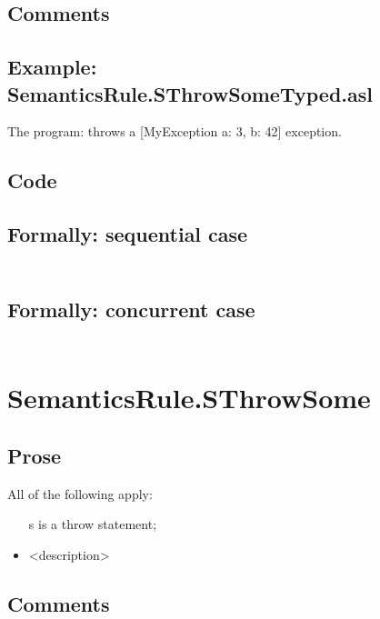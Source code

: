 \documentclass{book}
\begin{document}
    \subsection{Comments}

    \subsection{Example: SemanticsRule.SThrowSomeTyped.asl}
    The program:
    throws a [MyException {a: 3, b: 42}] exception.

  \subsection{Code}

  \subsection{Formally: sequential case}
  \begin{align}
  \end{align} 

  \subsection{Formally: concurrent case}
  \begin{align}
  \end{align} 

\section{SemanticsRule.SThrowSome \label{sec:SemanticsRule.SThrowSome}}

    \subsection{Prose}
    All of the following apply:
    \begin{itemize}
    \item [s] is a throw statement;
    \item <description>
    \end{itemize}

    \subsection{Comments}
\end{document}
